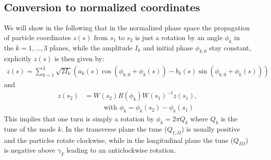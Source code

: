 \subsection{Conversion to normalized coordinates}
\label{opt:sec:3}
We will show in the following that in the normalized phase space the propagation of particle coordinates $z(s)$ from $s_1$ to $s_2$ is just a rotation by an angle $\phi_k$ in the $k=1,\ldots,3$ planes, while the amplitude $I_k$ and initial phase $\phi_{k,0}$ stay constant, explicitly $z(s)$ is then given by:
\begin{align}\label{opt:eqn:3:3}
z(s)=\sum_{k=1}^3 \sqrt{2I_k}\left(
a_k(s) \cos \left(\phi_{k,0} + \phi_k(s)\right) -
b_k(s) \sin \left(\phi_{k,0} + \phi_k(s)\right)
\right) 
\end{align}
and
\begin{align}
z(s_2)&=W(s_2)R(\phi_k)W(s_1)^{-1}z(s_1), \\
&\hspace{30pt} \text{ with } \phi_k=\phi_k(s_2)-\phi_k(s_1)\nonumber
\end{align}
This implies that one turn is simply a rotation by $\phi_k=2\pi Q_k$ where $Q_k$ is the tune of the mode $k$. In the transverse plane the tune ($Q_{I,II}$) is usually positive and the particles rotate clockwise, while in the longitudinal plane the tune ($Q_{III}$) is negative above $\gamma_T$ leading to an anticlockwise rotation.

